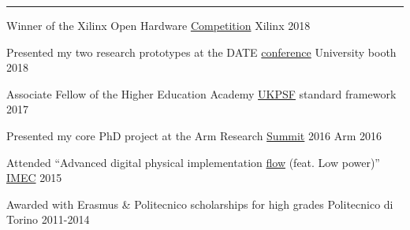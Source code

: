 \vspace{-3mm}
\rule{\textwidth}{0.5pt}\vspace{-1mm}

\vspace{-1mm}
\begin{cvhonors}

\cvhonor
{Winner of the Xilinx Open Hardware
{\color{myblue}\href{http://www.openhw.eu/2018-finalists.html}{Competition}}}
{Xilinx}
{}
{2018}

\cvhonor
{Presented my two research prototypes at the DATE
{\color{myblue}\href{https://www.date-conference.com/proceedings-archive/2018/html/ubooth.html}{conference}}}
{University booth}
{}
{2018}

\cvhonor
{Associate Fellow of the Higher Education Academy} %
{{\color{myblue}\href{https://www.heacademy.ac.uk/ukpsf}{UKPSF}} standard 
framework} %
{} %
{2017} %


\cvhonor
{Presented my core PhD project at the Arm Research
{\color{myblue}\href{https://developer.arm.com/research/summit/previous-summits/2016/speakers}{Summit}}
 2016}
{Arm}
{}
{2016}

\cvhonor
{Attended ``Advanced digital physical implementation
{\color{myblue}\href{http://www.europractice.stfc.ac.uk/training/training_flyers/adpi20171024.pdf}{flow}}
 (feat. Low power)''}
{\color{myblue}\href{https://www.imec-int.com/en/about-us}{IMEC}}
{}
{2015}

\cvhonor
{Awarded with Erasmus \& Politecnico scholarships for high grades}
{Politecnico di Torino}
{}
{2011-2014}


\end{cvhonors}
